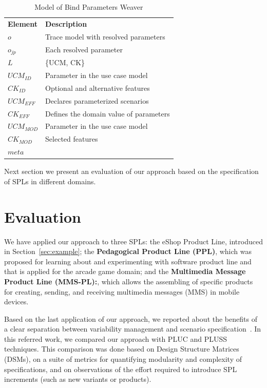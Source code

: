 \documentclass{acm_proc_article-sp}
\begin{document}
\begin{table}[h]
\begin{center}
\caption{Model of Bind Parameters Weaver} \label{tab:bp-weaver}
\begin{tabular}{p{0.6in}p{2.4in}}
   \hline\noalign{\smallskip}
  {\bf Element} & {\bf Description} \\
   \noalign{\smallskip}
   \hline
   \noalign{\smallskip}
   $o$               & Trace model with resolved parameters  \\ 
   $o_{jp}$        & Each resolved parameter \\ 
   $L$               & \{UCM, CK\} \\ 
   $UCM_{ID}$ & Parameter in the use case model \\
   $CK_{ID}$    & Optional and alternative features \\ 
   $UCM_{EFF}$ & Declares parameterized scenarios \\
   $CK_{EFF}$    & Defines the domain value of parameters \\ 
   $UCM_{MOD}$ & Parameter in the use case model \\
   $CK_{MOD}$    & Selected features \\ 
   $meta$ &  \\ 
  \hline
  \end{tabular}
\end{center}
\end{table}

Next section we present an evaluation of our approach based on the specification of SPLs in different domains. 

\section{Evaluation}
\label{sec:evaluation}

We have applied our approach to three SPLs: the eShop Product Line, introduced in Section~\ref{sec:example}; the  
{\bf Pedagogical Product Line (PPL)}, which was proposed for learning about and experimenting with software product line and that is applied for the arcade game domain; and the 
{\bf Multimedia Message Product Line (MMS-PL):}, which allows the assembling of specific products for creating, sending, and receiving multimedia messages (MMS) in mobile devices.

Based on the last application of our approach, we reported about the benefits of a clear separation between variability management and scenario specification~\cite{rbonifacio-ea-2008}. In this referred work, we compared our approach with PLUC and PLUSS techniques. This comparison was done based on Design Structure Matrices (DSMs), on a suite of metrics for quantifying modularity and complexity of specifications, and on observations of the effort required to introduce SPL increments (such as new variants or products). 
\end{document}
